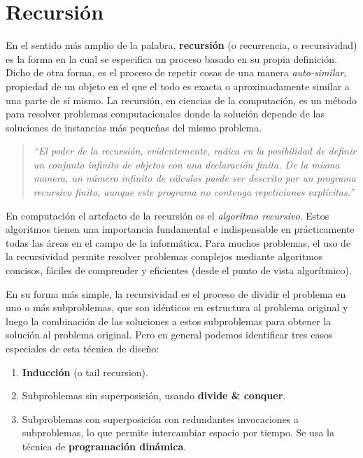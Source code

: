 \section{Recursión}

En el sentido más amplio de la palabra, \textbf{recursión} (o recurrencia, o recursividad) es la forma en la cual se especifica un proceso
basado en su propia definición. Dicho de otra forma, es el proceso de repetir cosas de una manera \textit{auto-similar}, propiedad de un
objeto en el que el todo es exacta o aproximadamente similar a una parte de sí mismo.
La recursión, en ciencias de la computación, es un método para resolver problemas computacionales donde la solución depende de las
soluciones de instancias más pequeñas del mismo problema\cite{conmath94}.

\begin{quote}
    \textit{``El poder de la recursión, evidentemente, radica en la posibilidad de definir un conjunto infinito de objetos con una
    declaración finita. De la misma manera, un número infinito de cálculos puede ser descrito por un programa recursivo finito, aunque este
    programa no contenga repeticiones explícitas.''}\cite{algdatpro76}
\end{quote}

En computación el artefacto de la recursión es el \textit{algoritmo recursivo}. Estos algoritmos tienen una importancia fundamental e
indispensable en prácticamente todas las áreas en el campo de la informática. Para muchos problemas, el uso de la recursividad permite
resolver problemas complejos mediante algoritmos concisos, fáciles de comprender y eficientes (desde el punto de vista algorítmico).

En su forma más simple, la recursividad es el proceso de dividir el problema en uno o más subproblemas, que son idénticos en estructura al
problema original y luego la combinación de las soluciones a estos subproblemas para obtener la solución al problema original. Pero en
general podemos identificar tres casos especiales de esta técnica de diseño:
\begin{enumerate}
    \item   \textbf{Inducción} (o tail recursion).
    \item   Subproblemas sin superposición, usando \textbf{divide \& conquer}.
    \item   Subproblemas con superposición con redundantes invocaciones a subproblemas, lo que permite intercambiar espacio por tiempo. Se
            usa la técnica de \textbf{programación dinámica}.
\end{enumerate}

